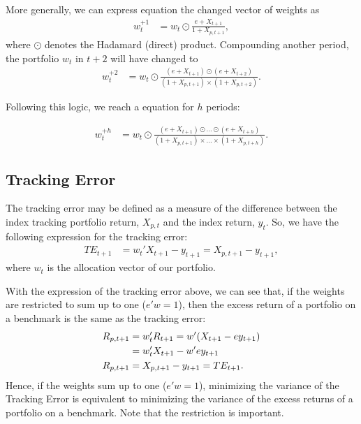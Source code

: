 \documentclass[preprint,authoryear,review,12pt]{elsarticle}
\begin{document}
More generally, we can express equation the changed vector of weights as
\begin{align}
	\label{eq:wplus1}
	w_{t}^{+1} &= w_{t} \odot \frac{e + X_{t+1}}{1 + X_{p,t+1}},
\end{align}
where $\odot$ denotes the Hadamard (direct) product.
Compounding another period, the portfolio $w_{t}$ in $t+2$ will have changed to
\begin{align*}
	w_{t}^{+2} &= w_{t} \odot 
	\frac{(e + X_{t+1})\odot(e + X_{t+2})}{(1 + X_{p,t+1})\times(1 + X_{p,t+2})}.
\end{align*}

Following this logic, we reach a equation for $h$ periods:

\begin{align}
	\label{eq:wplush}
	w_{t}^{+h} &= w_{t} \odot 
	\frac{(e + X_{t+1})\odot\dots\odot(e + X_{t+h})}
	{(1 + X_{p,t+1})\times \dots \times(1 + X_{p,t+h})}.
\end{align}

\subsection*{Tracking Error}

The tracking error may be defined as a measure of the difference between the index tracking portfolio return, $X_{p,t}$ and the index return, $y_{t}$.
So, we have the following expression for the tracking error:
\begin{align} 
	\label{eq:TE}
	TE_{t+1} &= w_{t}'X_{t+1} - y_{t+1} 
	= X_{p, t+1} - y_{t+1},
\end{align}
where $w_{t}$ is the allocation vector of our portfolio.

With the expression of the tracking error above, we can see that, if the weights are restricted to sum up to one ($e'w=1$), then the excess return of a portfolio on a benchmark is the same as the tracking error:
\begin{align}
	\notag
	R_{p,t+1} & = w_{t}'R_{t+1} = w'(X_{t+1} - e y_{t+1})
	\\
	\notag
	& = w_{t}'X_{t+1} - w'e y_{t+1}
	\\
	\label{eq:TER}
	R_{p,t+1} & = X_{p,t+1} - y_{t+1} = TE_{t+1}.
\end{align}
Hence, if the weights sum up to one ($e'w=1$), minimizing the variance of the Tracking Error is equivalent to minimizing the variance of the excess returns of a portfolio on a benchmark.
Note that the restriction is important.
\end{document}
